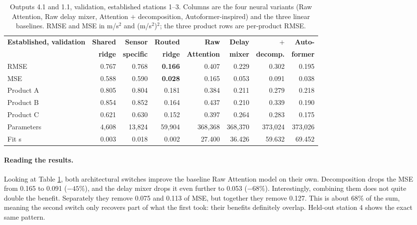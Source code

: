 \documentclass[11pt,letterpaper]{article}
\begin{document}
\begin{table}[htbp]
\centering
\small
\begin{tabular}{@{}lrrrrrrr@{}}
\toprule
\textbf{Established, validation} & \textbf{Shared} & \textbf{Sensor} & \textbf{Routed} &
\textbf{Raw} & \textbf{Delay} & \textbf{$+$} & \textbf{Auto-} \\
 & \textbf{ridge} & \textbf{specific} & \textbf{ridge} & \textbf{Attention} &
 \textbf{mixer} & \textbf{decomp.} & \textbf{former} \\
\midrule
RMSE       & 0.767 & 0.768 & \textbf{0.166} & 0.407 & 0.229 & 0.302 & 0.195 \\
MSE        & 0.588 & 0.590 & \textbf{0.028} & 0.165 & 0.053 & 0.091 & 0.038 \\
Product A  & 0.805 & 0.804 & 0.181 & 0.384 & 0.211 & 0.279 & 0.218 \\
Product B  & 0.854 & 0.852 & 0.164 & 0.437 & 0.210 & 0.339 & 0.190 \\
Product C  & 0.621 & 0.630 & 0.152 & 0.397 & 0.264 & 0.283 & 0.175 \\
Parameters & 4{,}608 & 13{,}824 & 59{,}904 & 368{,}368 & 368{,}370 & 373{,}024 & 373{,}026 \\
Fit s      & 0.003 & 0.018 & 0.002 & 27.400 & 36.426 & 59.632 & 69.452 \\
\bottomrule
\end{tabular}
\caption{Outputs 4.1 and 1.1, validation, established stations 1--3. Columns are the four neural
variants (Raw Attention, Raw delay mixer, Attention $+$ decomposition, Autoformer-inspired) and
the three linear baselines. RMSE and MSE in m/s$^2$ and (m/s$^2$)$^2$; the three product rows are
per-product RMSE.}
\label{tab:out41}
\end{table}

\paragraph{Reading the results.}
Looking at Table \ref{tab:out41}, both architectural switches improve the baseline Raw Attention model on their own. Decomposition drops the MSE from 0.165 to 0.091 ($-45\%$), and the delay mixer drops it even further to 0.053 ($-68\%$). Interestingly, combining them does not quite double the benefit. Separately they remove 0.075 and 0.113 of MSE, but together they remove 0.127. This is about 68\% of the sum, meaning the second switch only recovers part of what the first took: their benefits definitely overlap. Held-out station 4 shows the exact same pattern. 
\end{document}
